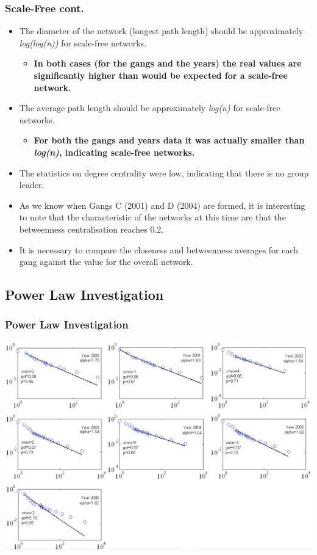 \documentclass[pdftex]{beamer}
\begin{document}
\begin{frame}
\frametitle{Scale-Free cont.}
\begin{itemize}
\item The diameter of the network (longest path length) should be
  approximately {\emph{log(log(n))}} for scale-free networks.
\begin{itemize}
\item {\textbf{In both cases (for the gangs and the years) the real values are
  significantly higher than would be expected for a scale-free
  network.}}
\end{itemize}
\pause
\item The average path length should be approximately {\emph{log(n)}} for
  scale-free networks. 
\begin{itemize}
\item {\textbf{For both the gangs and years data it was actually smaller
  than {\emph{log(n)}}, indicating scale-free networks.}}
\end{itemize}
\pause
\item The statistics on degree centrality were low, indicating that
  there is no group leader. 
\item As we know when Gangs C (2001) and D (2004) are formed, it is
  interesting to note that the characteristic of the networks at this
  time are that the betweenness centralisation reaches 0.2.
\item It is necessary to compare the closeness and betweenness
  averages for each gang against the value for the overall network.
\end{itemize}
\end{frame}

\subsection{Power Law Investigation}

\begin{frame}
\frametitle{Power Law Investigation}
\begin{center}
\includegraphics[width=0.9\paperwidth]{../images/clausetcumulative.pdf}
\end{center}
\end{frame}
\end{document}
